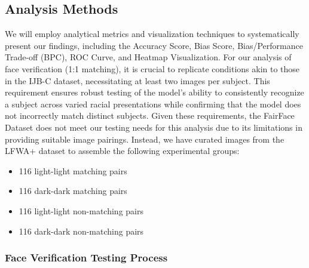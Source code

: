 \documentclass[conference]{IEEEtran}
\begin{document}
\subsection{Analysis Methods}
We will employ analytical metrics and visualization techniques to systematically present our findings, including the Accuracy Score, Bias Score, Bias/Performance Trade-off (BPC), ROC Curve, and Heatmap Visualization. For our analysis of face verification (1:1 matching), it is crucial to replicate conditions akin to those in the IJB-C \cite{maze2018iarpa} dataset, necessitating at least two images per subject. This requirement ensures robust testing of the model’s ability to consistently recognize a subject across varied racial presentations while confirming that the model does not incorrectly match distinct subjects. Given these requirements, the FairFace Dataset does not meet our testing needs for this analysis due to its limitations in providing suitable image pairings. Instead, we have curated images from the LFWA+\cite{liu2015faceattributes} dataset to assemble the following experimental groups:

\begin{itemize}
    \item 116 light-light matching pairs
    \item 116 dark-dark matching pairs
    \item 116 light-light non-matching pairs
    \item 116 dark-dark non-matching pairs
\end{itemize}

\subsubsection{Face Verification Testing Process}
\end{document}
